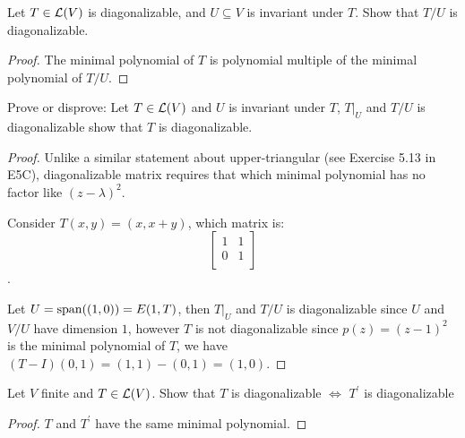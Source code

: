 \documentclass[../main.tex]{subfiles}
\begin{document}
\begin{exercise}
  Let $T \in \mathcal{L}(V)$ is diagonalizable, and $U \subseteq V$ is invariant under $T$.
  Show that $T/U$ is diagonalizable.
\end{exercise}
\begin{proof}
  The minimal polynomial of $T$ is polynomial multiple of the minimal polynomial of $T/U$.
\end{proof}

\begin{exercise}
  Prove or disprove: Let $T \in \mathcal{L}(V)$ and $U$ is invariant under $T$, $T\big|_U$ and $T/U$ is diagonalizable
  show that $T$ is diagonalizable.
\end{exercise}
\begin{proof}
  Unlike a similar statement about upper-triangular (see Exercise 5.13 in E5C),
  diagonalizable matrix requires that which minimal polynomial has no factor like $(z - \lambda)^2$.

  Consider $T(x, y) = (x, x + y)$, which matrix is:
  \[
  \begin{bmatrix}
    1 & 1 \\
    0 & 1 \\
  \end{bmatrix}
  \].

  Let $U = \operatorname{span}((1, 0)) = E(1, T)$, then $T\big|_U$ and $T/U$ is diagonalizable since
  $U$ and $V/U$ have dimension $1$, however $T$ is not diagonalizable since $p(z) = (z - 1)^2$
  is the minimal polynomial of $T$, we have $(T - I)(0, 1) = (1, 1) - (0, 1) = (1, 0)$.
\end{proof}

\begin{exercise}
  Let $V$ finite and $T \in \mathcal{L}(V)$. Show that $T$ is diagonalizable $\iff$ $T^\prime$
  is diagonalizable
\end{exercise}
\begin{proof}
  $T$ and $T^\prime$ have the same minimal polynomial.
\end{proof}
\end{document}
